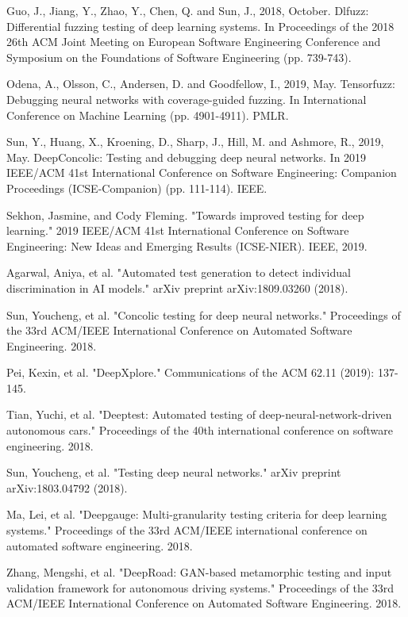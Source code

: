 \begin{singlespace}
\begin{thebibliography}{}
   
    Guo, J., Jiang, Y., Zhao, Y., Chen, Q. and Sun, J., 2018, October. Dlfuzz: Differential fuzzing testing of deep learning systems. In Proceedings of the 2018 26th ACM Joint Meeting on European Software Engineering Conference and Symposium on the Foundations of Software Engineering (pp. 739-743).

     Odena, A., Olsson, C., Andersen, D. and Goodfellow, I., 2019, May. Tensorfuzz: Debugging neural networks with coverage-guided fuzzing. In International Conference on Machine Learning (pp. 4901-4911). PMLR.

    Sun, Y., Huang, X., Kroening, D., Sharp, J., Hill, M. and Ashmore, R., 2019, May. DeepConcolic: Testing and debugging deep neural networks. In 2019 IEEE/ACM 41st International Conference on Software Engineering: Companion Proceedings (ICSE-Companion) (pp. 111-114). IEEE.

     Sekhon, Jasmine, and Cody Fleming. "Towards improved testing for deep learning." 2019 IEEE/ACM 41st International Conference on Software Engineering: New Ideas and Emerging Results (ICSE-NIER). IEEE, 2019.

 Agarwal, Aniya, et al. "Automated test generation to detect individual discrimination in AI models." arXiv preprint arXiv:1809.03260 (2018).

 Sun, Youcheng, et al. "Concolic testing for deep neural networks." Proceedings of the 33rd ACM/IEEE International Conference on Automated Software Engineering. 2018.

 Pei, Kexin, et al. "DeepXplore." Communications of the ACM 62.11 (2019): 137-145.

 Tian, Yuchi, et al. "Deeptest: Automated testing of deep-neural-network-driven autonomous cars." Proceedings of the 40th international conference on software engineering. 2018.

 Sun, Youcheng, et al. "Testing deep neural networks." arXiv preprint arXiv:1803.04792 (2018).

 Ma, Lei, et al. "Deepgauge: Multi-granularity testing criteria for deep learning systems." Proceedings of the 33rd ACM/IEEE international conference on automated software engineering. 2018.

 Zhang, Mengshi, et al. "DeepRoad: GAN-based metamorphic testing and input validation framework for autonomous driving systems." Proceedings of the 33rd ACM/IEEE International Conference on Automated Software Engineering. 2018.


\end{thebibliography}
\end{singlespace}
